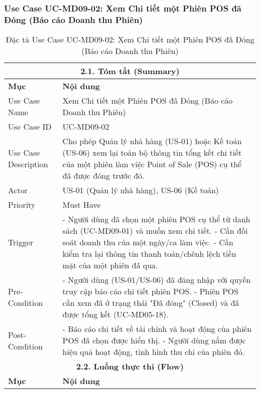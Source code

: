 \subsubsection{Use Case UC-MD09-02: Xem Chi tiết một Phiên POS đã Đóng (Báo cáo Doanh thu Phiên)}
\begin{longtable}{|m{4cm}|p{11cm}|}
\caption{Đặc tả Use Case UC-MD09-02: Xem Chi tiết một Phiên POS đã Đóng (Báo cáo Doanh thu Phiên)} \label{tab:uc_md09_02_corrected} \\
\hline
\multicolumn{2}{|c|}{\textbf{2.1. Tóm tắt (Summary)}} \\
\hline
\textbf{Mục} & \textbf{Nội dung} \\
\hline
\endhead %
\midrule
\endfoot %
\bottomrule
\endlastfoot %
Use Case Name & Xem Chi tiết một Phiên POS đã Đóng (Báo cáo Doanh thu Phiên) \\
\hline
Use Case ID & UC-MD09-02 \\
\hline
Use Case Description & Cho phép Quản lý nhà hàng (US-01) hoặc Kế toán (US-06) xem lại toàn bộ thông tin tổng kết chi tiết của một phiên làm việc Point of Sale (POS) cụ thể đã được đóng trước đó. \\
\hline
Actor & US-01 (Quản lý nhà hàng), US-06 (Kế toán) \\
\hline
Priority & Must Have \\
\hline
Trigger & - Người dùng đã chọn một phiên POS cụ thể từ danh sách (UC-MD09-01) và muốn xem chi tiết. \newline - Cần đối soát doanh thu của một ngày/ca làm việc. \newline - Cần kiểm tra lại thông tin thanh toán/chênh lệch tiền mặt của một phiên đã qua. \\
\hline
Pre-Condition & - Người dùng (US-01/US-06) đã đăng nhập với quyền truy cập báo cáo chi tiết phiên POS. \newline - Phiên POS cần xem đã ở trạng thái "Đã đóng" (Closed) và đã được tổng kết (UC-MD05-18). \\
\hline
Post-Condition & - Báo cáo chi tiết về tài chính và hoạt động của phiên POS đã chọn được hiển thị. \newline - Người dùng nắm được hiệu quả hoạt động, tình hình thu chi của phiên đó. \\
\hline
\multicolumn{2}{|c|}{\textbf{2.2. Luồng thực thi (Flow)}} \\
\hline
\textbf{Mục} & \textbf{Nội dung} \\
\hline

\end{longtable}
